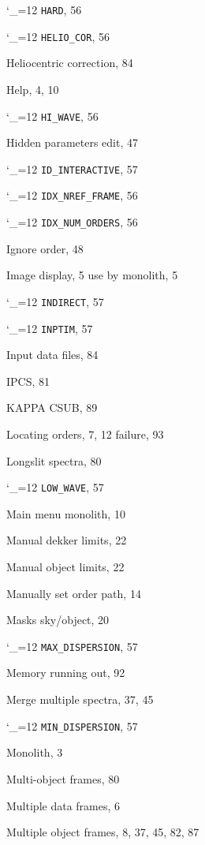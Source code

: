 \documentclass[11pt,twoside]{article}
\newcommand{\cmdname}{\begingroup \catcode`\_=12 \realcmdname}
\newcommand{\realcmdname}[1]{\endgroup\texttt{#1}}
\begin{document}
\begin{theindex}
  \indexspace

  \item \cmdname {HARD}, 56
  \item \cmdname {HELIO_COR}, 56
  \item Heliocentric correction, 84
  \item Help, 4, 10
  \item \cmdname {HI_WAVE}, 56
  \item Hidden parameters
    \subitem edit, 47

  \indexspace

  \item \cmdname {ID_INTERACTIVE}, 57
  \item \cmdname {IDX_NREF_FRAME}, 56
  \item \cmdname {IDX_NUM_ORDERS}, 56
  \item Ignore order, 48
  \item Image display, 5
    \subitem use by monolith, 5
  \item \cmdname {INDIRECT}, 57
  \item \cmdname {INPTIM}, 57
  \item Input data files, 84
  \item IPCS, 81

  \indexspace

  \item KAPPA
    \subitem CSUB, 89

  \indexspace

  \item Locating orders, 7, 12
    \subitem failure, 93
  \item Longslit spectra, 80
  \item \cmdname {LOW_WAVE}, 57

  \indexspace

  \item Main menu
    \subitem monolith, 10
  \item Manual dekker limits, 22
  \item Manual object limits, 22
  \item Manually set order path, 14
  \item Masks
    \subitem sky/object, 20
  \item \cmdname {MAX_DISPERSION}, 57
  \item Memory
    \subitem running out, 92
  \item Merge multiple spectra, 37, 45
  \item \cmdname {MIN_DISPERSION}, 57
  \item Monolith, 3
  \item Multi-object frames, 80
  \item Multiple data frames, 6
  \item Multiple object frames, 8, 37, 45, 82, 87


\end{theindex}
\end{document}
